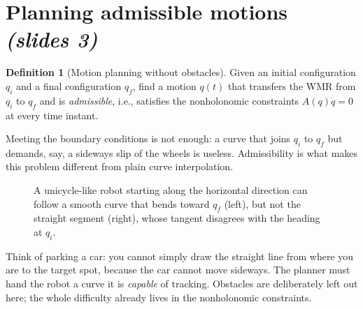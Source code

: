 \documentclass[11pt,a4paper]{article}
\def\boldsymbol#1{#1}%
\newcommand{\q}{\boldsymbol{q}}
\newcommand{\qi}{\boldsymbol{q}_i}
\newcommand{\qf}{\boldsymbol{q}_f}
\theoremstyle{definition}
\newtheorem{definition}{Definition}[section]
\theoremstyle{plain}
\theoremstyle{remark}
\begin{document}
\section{Planning admissible motions \emph{(slides 3)}}

\begin{definition}[Motion planning without obstacles]
Given an initial configuration $\qi$ and a final configuration $\qf$, find a motion $\q(t)$ that transfers the WMR
from $\qi$ to $\qf$ and is \emph{admissible}, i.e., satisfies the nonholonomic constraints
$A(\q)\dot{\q}=0$ at every time instant.
\end{definition}

Meeting the boundary conditions is not enough: a curve that joins $\qi$ to $\qf$ but demands, say, a sideways
slip of the wheels is useless. Admissibility is what makes this problem different from plain curve interpolation.

\begin{figure}[h]
\centering
{}
\caption{A unicycle-like robot starting along the horizontal direction can follow a smooth curve that bends toward
$\qf$ (left), but not the straight segment (right), whose tangent disagrees with the heading at $\qi$.}
\end{figure}

\begin{intuition}
Think of parking a car: you cannot simply draw the straight line from where you are to the target spot, because the
car cannot move sideways. The planner must hand the robot a curve it is \emph{capable} of tracking.
Obstacles are deliberately left out here; the whole difficulty already lives in the nonholonomic constraints.
\end{intuition}
\end{document}
